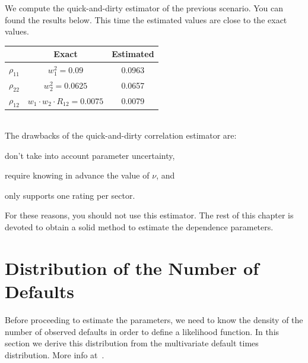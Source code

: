 \documentclass[11pt,fleqn]{book} %
\begin{document}
We compute the quick-and-dirty estimator of the previous scenario. 
You can found the results below. This time the estimated values are close 
to the exact values.

\hspace*{1cm}
\begin{tabular}{c|c|c|}
	\cline{2-3}
	& Exact & Estimated \\
	\hline
	\multicolumn{1}{|c|}{$\rho_{11}$} & $w_1^2 = 0.09$ & 0.0963 \\
	\hline
	\multicolumn{1}{|c|}{$\rho_{22}$} & $w_2^2 = 0.0625$ & 0.0657 \\
	\hline
	\multicolumn{1}{|c|}{$\rho_{12}$} & $w_1 \cdot w_2 \cdot R_{12} = 0.0075$ & 0.0079 \\
	\hline
\end{tabular}
\ \\

The drawbacks of the quick-and-dirty correlation estimator are:
\begin{inparaenum}[1)]
	\item don't take into account parameter uncertainty, 
	\item require knowing in advance the value of $\nu$, and
	\item only supports one rating per sector.
\end{inparaenum}
For these reasons, you should not use this estimator. The rest of 
this chapter is devoted to obtain a solid method to estimate the 
dependence parameters.

\section{Distribution of the Number of Defaults}

Before proceeding to estimate the parameters, we need to know the density
of the number of observed defaults in order to define a likelihood 
function. In this section we derive this distribution from the multivariate
default times distribution. More info at~\cite{gordy:2002,roncalli:2004}.
\end{document}

